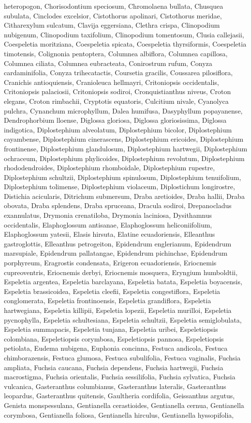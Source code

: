 \documentclass[]{article}
\begin{document}
heteropogon, Chorisodontium speciosum, Chromolaena bullata, Chusquea subulata, Cinclodes excelsior, Cistothorus apolinari, Cistothorus meridae, Citharexylum sulcatum, Clavija eggersiana, Clethra crispa, Clinopodium nubigenum, Clinopodium taxifolium, Clinopodium tomentosum, Clusia callejasii, Coespeletia moritziana, Coespeletia spicata, Coespeletia thyrsiformis, Coespeletia timotensis, Colignonia pentoptera, Columnea albiflora, Columnea capillosa, Columnea ciliata, Columnea eubracteata, Conirostrum rufum, Conyza cardaminifolia, Conyza trihecatactis, Coursetia gracilis, Coussarea pilosiflora, Cranichis antioquiensis, Cranioleuca hellmayri, Critoniopsis occidentalis, Critoniopsis palaciosii, Critoniopsis sodiroi, Cronquistianthus niveus, Croton elegans, Croton rimbachii, Cryptotis equatoris, Culcitium nivale, Cyanolyca pulchra, Cynanchum microphyllum, Dalea humifusa, Dasyphyllum popayanense, Dendrophorbium lloense, Diglossa gloriosa, Diglossa gloriosissima, Diglossa indigotica, Diplostephium alveolatum, Diplostephium bicolor, Diplostephium cayambense, Diplostephium cinerascens, Diplostephium ericoides, Diplostephium frontinense, Diplostephium glandulosum, Diplostephium hartwegii, Diplostephium ochraceum, Diplostephium phylicoides, Diplostephium revolutum, Diplostephium rhododendroides, Diplostephium rhomboidale, Diplostephium rupestre, Diplostephium schultzii, Diplostephium spinulosum, Diplostephium tenuifolium, Diplostephium tolimense, Diplostephium violaceum, Diplostichum longirostre, Distichia acicularis, Ditrichum submersum, Draba aretioides, Draba hallii, Draba obovata, Draba splendens, Draba spruceana, Dracula sodiroi, Drepanocladus exannulatus, Drymonia crenatiloba, Drymonia laciniosa, Dysithamnus occidentalis, Elaphoglossum antisanae, Elaphoglossum heliconiifolium, Elaphoglossum yatesii, Elasis hirsuta, Elatine ecuadoriensis, Elleanthus gastroglottis, Elleanthus petrogeiton, Epidendrum englerianum, Epidendrum marsupiale, Epidendrum pallatangae, Epidendrum pichinchae, Epidendrum porphyreum, Eragrostis condensata, Erigeron ecuadoriensis, Eriocnemis cupreoventris, Eriocnemis derbyi, Eriocnemis mosquera, Eryngium humboldtii, Espeletia argentea, Espeletia barclayana, Espeletia batata, Espeletia boyacensis, Espeletia brassicoidea, Espeletia cleefii, Espeletia congestiflora, Espeletia conglomerata, Espeletia frontinoensis, Espeletia grandiflora, Espeletia hartwegiana, Espeletia killipii, Espeletia lopezii, Espeletia murilloi, Espeletia pycnophylla, Espeletia schultesiana, Espeletia schultzii, Espeletia semiglobulata, Espeletia summapacis, Espeletia tunjana, Espeletia uribei, Espeletiopsis colombiana, Espeletiopsis corymbosa, Espeletiopsis pannosa, Espeletiopsis petiolata, Eudema nubigena, Euphonia concinna, Festuca andicola, Festuca chimborazensis, Festuca glumosa, Festuca subulifolia, Festuca vaginalis, Fuchsia ampliata, Fuchsia caucana, Fuchsia dependens, Fuchsia hartwegii, Fuchsia macrostigma, Fuchsia orientalis, Fuchsia sessilifolia, Fuchsia sylvatica, Fuchsia vulcanica, Gasteranthus columbianus, Gasteranthus lateralis, Gasteranthus leopardus, Gasteranthus quitensis, Gaultheria cordifolia, Geissanthus argutus, Genista monspessulana, Gentianella cerastioides, Gentianella cernua, Gentianella corymbosa, Gentianella foliosa, Gentianella hirculus, Gentianella hyssopifolia, 
\end{document}
